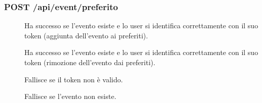 \documentclass{article}
\begin{document}
\subsubsection{POST /api/event/preferito}
\begin{description}
    \item[] Ha successo se l'evento esiste e lo user si identifica correttamente con il suo token (aggiunta dell'evento ai preferiti).
    \item[] Ha successo se l'evento esiste e lo user si identifica correttamente con il suo token (rimozione dell'evento dai preferiti).
    \item[] Fallisce se il token non è valido.
    \item[] Fallisce se l'evento non esiste.
\end{description}
\end{document}
